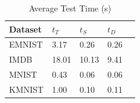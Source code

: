\begin{table}
\caption{Average Test Time (s)}
\label{tab:test-time}
\begin{tabular}{lllll}
\toprule
Dataset & $t_T$ & $t_S$ & $t_D$ \\
\midrule
EMNIST & 3.17 & 0.26 & 0.26 \\
IMDB & 18.01 & 10.13 & 9.41 \\
MNIST & 0.43 & 0.06 & 0.06 \\
KMNIST & 1.00 & 0.10 & 0.11 \\
\bottomrule
\end{tabular}
\end{table}

